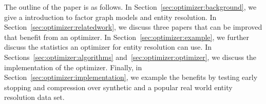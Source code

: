 The outline of the paper is as follows.
In Section~\ref{sec:optimizer:background}, we give a introduction to factor graph models and entity resolution.
In Section~\ref{sec:optimizer:relatedwork}, we discuss three papers that can be improved that benefit from an optimizer.
In Section~\ref{sec:optimizer:example}, we further discuss the statistics an optimizer for entity resolution can use.
In Sections~\ref{sec:optimizer:algorithms} and~\ref{sec:optimizer:optimizer}, we discuss the implementation of the optimizer.
Finally, in Section~\ref{sec:optimizer:implementation}, we example 
the benefits by testing early stopping and compression over synthetic and a popular real world entity resolution data set.



